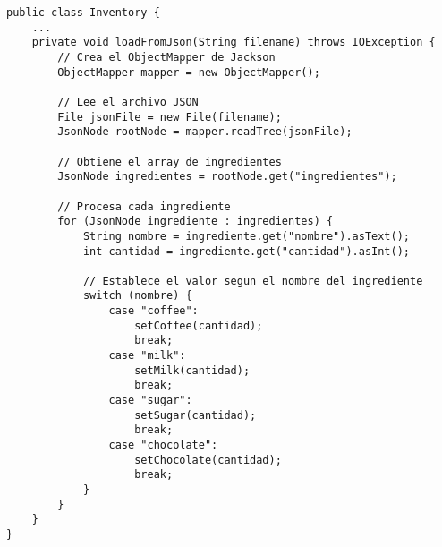 \begin{lstlisting}
public class Inventory {
    ...
    private void loadFromJson(String filename) throws IOException {
        // Crea el ObjectMapper de Jackson
        ObjectMapper mapper = new ObjectMapper();
        
        // Lee el archivo JSON
        File jsonFile = new File(filename);
        JsonNode rootNode = mapper.readTree(jsonFile);
        
        // Obtiene el array de ingredientes
        JsonNode ingredientes = rootNode.get("ingredientes");
        
        // Procesa cada ingrediente
        for (JsonNode ingrediente : ingredientes) {
            String nombre = ingrediente.get("nombre").asText();
            int cantidad = ingrediente.get("cantidad").asInt();
            
            // Establece el valor segun el nombre del ingrediente
            switch (nombre) {
                case "coffee":
                    setCoffee(cantidad);
                    break;
                case "milk":
                    setMilk(cantidad);
                    break;
                case "sugar":
                    setSugar(cantidad);
                    break;
                case "chocolate":
                    setChocolate(cantidad);
                    break;
            }
        }
    }
}
\end{lstlisting}